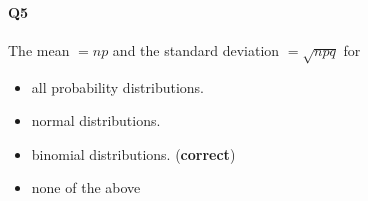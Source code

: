 \documentclass[12pt,letter]{article}
\begin{document}
\paragraph{Q5}
The mean $=n p$ and the standard deviation $=\sqrt{n p q}$ for
\begin{itemize}
	\item all probability distributions.
\item  normal distributions.
\item  binomial distributions. (\textbf{correct})
\item  none of the above
\end{itemize}
\end{document}
